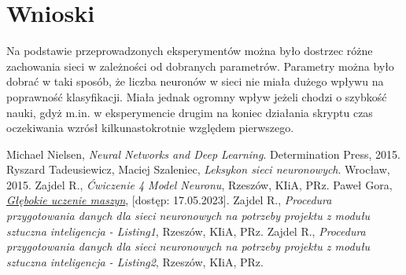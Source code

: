 \documentclass{article}
\begin{document}
\newpage
\section{Wnioski}
Na podstawie przeprowadzonych eksperymentów można było dostrzec różne zachowania sieci w zależności od dobranych parametrów.
Parametry można było dobrać w taki sposób, że liczba neuronów w sieci nie miała dużego wpływu na poprawność klasyfikacji.
Miała jednak ogromny wpływ jeżeli chodzi o szybkość nauki, gdyż m.in. w eksperymencie drugim na koniec działania skryptu czas oczekiwania wzrósł kilkunastokrotnie względem pierwszego.

\newpage
\begin{thebibliography}{9}
    Michael Nielsen,
    \emph{Neural Networks and Deep Learning}.
    Determination Press,
    2015.
    Ryszard Tadeusiewicz, Maciej Szaleniec,
    \emph{Leksykon sieci neuronowych}.
    Wrocław,
    2015.
    Zajdel R.,
    \emph{Ćwiczenie 4 Model Neuronu},
    Rzeszów,
    KIiA, PRz.
    Paweł Gora,
    \href{https://www.deltami.edu.pl/temat/informatyka/sztuczna_inteligencja/2017/12/28/Glebokie_uczenie_maszyn/}{\emph{Głębokie uczenie maszyn}},
    [dostęp: 17.05.2023].
    Zajdel R.,
    \emph{Procedura przygotowania danych dla sieci neuronowych na potrzeby projektu z modułu sztuczna inteligencja - Listing1},
    Rzeszów,
    KIiA, PRz.
    Zajdel R.,
    \emph{Procedura przygotowania danych dla sieci neuronowych na potrzeby projektu z modułu sztuczna inteligencja - Listing2},
    Rzeszów,
    KIiA, PRz.
\end{thebibliography}
\end{document}
